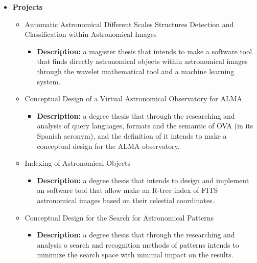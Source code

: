 \begin{itemize}
\item \textbf{Projects} 
\begin {itemize}
\item Automatic Astronomical Different Scales Structures Detection and Classification within Astronomical Images
\begin{itemize}
\item \textbf{Description:} a magister thesis that intends to make a software
tool that finds directly astronomical objects within astronomical images through
the wavelet mathematical tool and a machine learning system.
\end{itemize}
\end {itemize}
\begin{itemize}
\item Conceptual Design of a Virtual Astronomical Observatory for ALMA
\begin{itemize}
\item \textbf{Description:} a degree thesis that through the researching and
analysis of query languages, formats and the semantic of OVA (in its Spanish
acronym), and the definition of it intends to make a conceptual design for the
ALMA observatory.
\end{itemize}
\item Indexing of Astronomical Objects
\begin{itemize}
\item \textbf{Description:} a degree thesis that intends to design and implement
an software tool that allow make an R-tree index of FITS astronomical images
based on their celestial coordinates.
\end{itemize}
\item Conceptual Design for the Search for Astronomical Patterns
\begin{itemize}
\item \textbf{Description:} a degree thesis that through the researching and
analysis o search and recognition methods of patterns intends to minimize the
search space with minimal impact on the results. 
\end{itemize}
\end{itemize}
\end{itemize}

